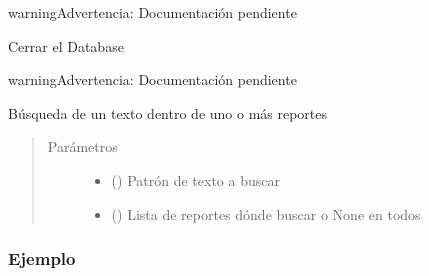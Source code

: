 \documentclass[a4paper,12pt,spanish]{sphinxmanual}
\begin{document}
\begin{fulllineitems}
\begin{fulllineitems}
\begin{sphinxadmonition}{warning}{Advertencia:}
Documentación pendiente
\end{sphinxadmonition}

\end{fulllineitems}


\begin{fulllineitems}
\label{\detokenize{openerm.Database:openerm.Database.Database.close}}
Cerrar el Database

\begin{sphinxadmonition}{warning}{Advertencia:}
Documentación pendiente
\end{sphinxadmonition}

\end{fulllineitems}


\begin{fulllineitems}
\label{\detokenize{openerm.Database:openerm.Database.Database.find_text}}
Búsqueda de un texto dentro de uno o más reportes
\begin{quote}\begin{description}
\item[{Parámetros}] \leavevmode\begin{itemize}
\item {} 
 () \textendash{} Patrón de texto a buscar

\item {} 
 () \textendash{} Lista de reportes dónde buscar o None en todos

\end{itemize}

\end{description}\end{quote}
\subsubsection*{Ejemplo}


\end{fulllineitems}
\end{fulllineitems}
\end{document}
